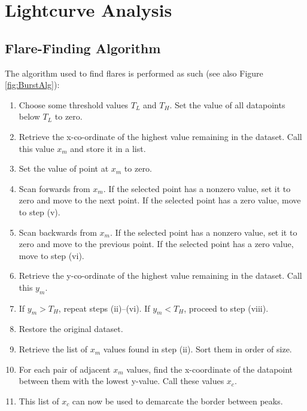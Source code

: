 \section{Lightcurve Analysis}

\subsection{Flare-Finding Algorithm}
\label{sec:Flares}

\par The algorithm used to find flares is performed as such (see also Figure \ref{fig:BurstAlg}):

\begin{enumerate}
  \item Choose some threshold values $T_L$ and $T_H$.  Set the value of all datapoints below $T_L$ to zero.
  \item Retrieve the x-co-ordinate of the highest value remaining in the dataset.  Call this value $x_m$ and store it in a list.
  \item Set the value of point at $x_m$ to zero.
  \item Scan forwards from $x_m$.  If the selected point has a nonzero value, set it to zero and move to the next point.  If the selected point has a zero value, move to step (v).
  \item Scan backwards from $x_m$.  If the selected point has a nonzero value, set it to zero and move to the previous point.  If the selected point has a zero value, move to step (vi).
  \item Retrieve the y-co-ordinate of the highest value remaining in the dataset.  Call this $y_m$.
  \item If $y_m>T_H$, repeat steps (ii)--(vi).  If $y_m<T_H$, proceed to step (viii).
  \item Restore the original dataset.
  \item Retrieve the list of $x_m$ values found in step (ii).  Sort them in order of size.
  \item For each pair of adjacent $x_m$ values, find the x-coordinate of the datapoint between them with the lowest y-value.  Call these values $x_c$.
  \item This list of $x_c$ can now be used to demarcate the border between peaks.
\end{enumerate}


